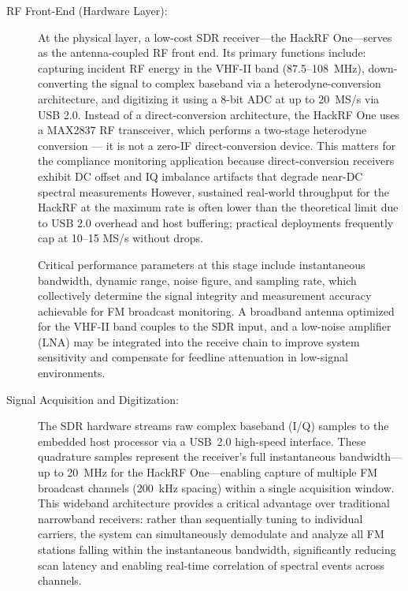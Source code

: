\documentclass[11pt]{report}
\begin{document}
\begin{description}
	\item[RF Front-End (Hardware Layer): ] 
 At the physical layer, a low-cost SDR receiver---the HackRF One---serves as the antenna-coupled RF front end. Its primary functions include: capturing incident RF energy in the VHF-II band (87.5--108~MHz), down-converting the signal to complex baseband via a heterodyne-conversion architecture, and digitizing it using a 8-bit ADC at up to 20~MS/s via USB 2.0. Instead of a direct-conversion architecture, the HackRF One uses a MAX2837 RF transceiver, which performs a two-stage heterodyne conversion — it is not a zero-IF direct-conversion device. This matters for the compliance monitoring application because direct-conversion receivers exhibit DC offset and IQ imbalance artifacts that degrade near-DC spectral measurements
However, sustained real-world throughput for the HackRF at the maximum rate is often lower than the theoretical limit due to USB 2.0 overhead and host buffering; practical deployments frequently cap at 10–15 MS/s without drops.
 
Critical performance parameters at this stage include instantaneous bandwidth, dynamic range, noise figure, and sampling rate, which collectively determine the signal integrity and measurement accuracy achievable for FM broadcast monitoring. A broadband antenna optimized for the VHF-II band couples to the SDR input, and a low-noise amplifier (LNA) may be integrated into the receive chain to improve system sensitivity and compensate for feedline attenuation in low-signal environments.

	\item[Signal Acquisition and Digitization: ] 
The SDR hardware streams raw complex baseband (I/Q) samples to the embedded host processor via a USB~2.0 high-speed interface. These quadrature samples represent the receiver's full instantaneous bandwidth---up to 20~MHz for the HackRF One---enabling capture of multiple FM broadcast channels (200~kHz spacing) within a single acquisition window. This wideband architecture provides a critical advantage over traditional narrowband receivers: rather than sequentially tuning to individual carriers, the system can simultaneously demodulate and analyze all FM stations falling within the instantaneous bandwidth, significantly reducing scan latency and enabling real-time correlation of spectral events across channels.


\end{description}
\end{document}
